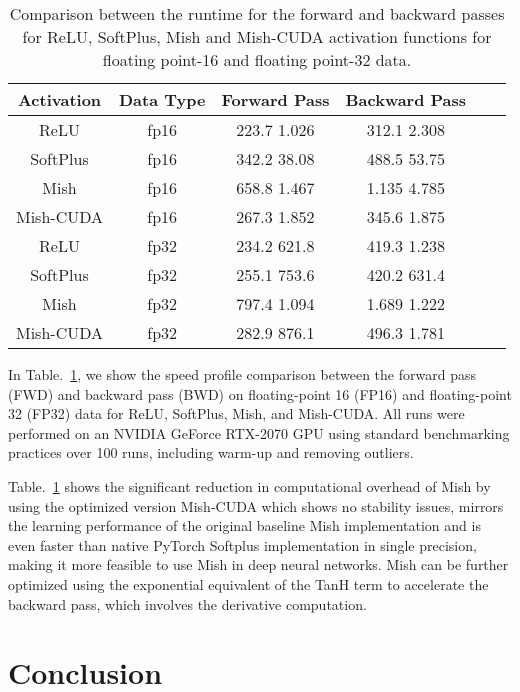 \documentclass{bmvc2k}
\begin{document}
\begin{table}[h]
	\begin{center}
		\begin{tabular}{|c|c|c|c|c|c|}
			\hline
			Activation & Data Type & Forward Pass & Backward Pass \\
			\hline\hline
			ReLU & fp16 & 223.7  1.026 & 312.1  2.308 \\
			SoftPlus & fp16 & 342.2  38.08 & 488.5  53.75 \\
			Mish & fp16 & 658.8  1.467 & 1.135  4.785 \\
			Mish-CUDA & fp16 & 267.3  1.852 & 345.6  1.875 \\
			\hline
			ReLU & fp32 & 234.2  621.8  & 419.3  1.238 \\
			SoftPlus & fp32 & 255.1  753.6 & 420.2  631.4 \\
			Mish & fp32 & 797.4  1.094 & 1.689  1.222 \\
			Mish-CUDA & fp32 & 282.9  876.1 & 496.3  1.781 \\
			\hline
		\end{tabular}
	\end{center}
	\caption{Comparison between the runtime for the forward and backward passes for ReLU, SoftPlus, Mish and Mish-CUDA activation functions for floating point-16 and floating point-32 data.}
	\label{tab:speed}
\end{table}

In Table.~\ref{tab:speed}, we show the speed profile comparison between the forward pass (FWD) and backward pass (BWD) on floating-point 16 (FP16) and floating-point 32 (FP32) data for ReLU, SoftPlus, Mish, and Mish-CUDA. All runs were performed on an NVIDIA GeForce RTX-2070 GPU using standard benchmarking practices over 100 runs, including warm-up and removing outliers.

Table.~\ref{tab:speed} shows the significant reduction in computational overhead of Mish by using the optimized version Mish-CUDA which shows no stability issues, mirrors the learning performance of the original baseline Mish implementation and is even faster than native PyTorch Softplus implementation in single precision, making it more feasible to use Mish in deep neural networks. Mish can be further optimized using the exponential equivalent of the TanH term to accelerate the backward pass, which involves the derivative computation.

\section{Conclusion}
\end{document}
